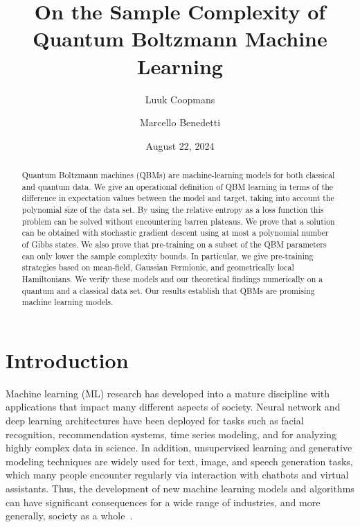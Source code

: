 \documentclass[
    reprint,
    aps,
    prx,
    longbibliography
]{revtex4-2}
\begin{document}
\title{On the Sample Complexity of Quantum Boltzmann Machine Learning}

\author{Luuk Coopmans}

\author{Marcello Benedetti}

\date{August 22, 2024}

\begin{abstract}
Quantum Boltzmann machines (QBMs) are machine-learning models for both classical and quantum data. We give an operational definition of QBM learning in terms of the difference in expectation values between the model and target, taking into account the polynomial size of the data set.
By using the relative entropy as a loss function this problem can be solved without encountering barren plateaus.
We prove that a solution can be obtained with stochastic gradient descent using at most a polynomial number of Gibbs states. 
We also prove that pre-training on a subset of the QBM parameters can only lower the sample complexity bounds. In particular, we give pre-training strategies based on mean-field, Gaussian Fermionic, and geometrically local Hamiltonians. We verify these models and our theoretical findings numerically on a quantum and a classical data set. 
Our results establish that QBMs are promising machine learning models.
\end{abstract}

\maketitle

\section*{Introduction}

Machine learning (ML) research has developed into a mature discipline with applications that impact many different aspects of society. Neural network and deep learning architectures have been deployed for tasks such as facial recognition, recommendation systems, time series modeling, and for analyzing highly complex data in science. In addition, unsupervised learning and generative modeling techniques are widely used for text, image, and speech generation tasks, which many people encounter regularly via interaction with chatbots and virtual assistants. Thus, the development of new machine learning models and algorithms can have significant consequences for a wide range of industries, and more generally, society as a whole~\cite{Bommasani_2021}.
\end{document}
